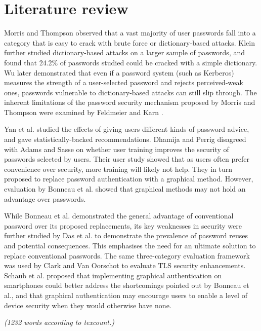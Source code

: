 \documentclass[11pt]{article}
\begin{document}
\section{Literature review}

Morris and Thompson \cite[p. 596]{morris1979password} observed that a vast majority of user passwords fall into a category that is easy to crack with brute force or dictionary-based attacks. Klein \cite{klein1990foiling} further studied dictionary-based attacks on a larger sample of passwords, and found that 24.2\% of passwords studied could be cracked with a simple dictionary. Wu \cite{wu1999real} later demonstrated that even if a password system (such as Kerberos) measures the strength of a user-selected password and rejects perceived-weak ones, passwords vulnerable to dictionary-based attacks can still slip through. The inherent limitations of the password security mechanism proposed by Morris and Thompson were examined by Feldmeier and Karn \cite{feldmeier1989unix}.

Yan et al. \cite{yan2004password} studied the effects of giving users different kinds of password advice, and gave statistically-backed recommendations. Dhamija and Perrig \cite[Sec. 5]{dhamija2000deja} disagreed with Adams and Sasse \cite{adams1999users} on whether user training improves the security of passwords selected by users. Their user study showed that as users often prefer convenience over security, more training will likely not help. They in turn proposed to replace password authentication with a graphical method. However, evaluation by Bonneau et al. \cite[Sec. IV, D]{bonneau2012quest} showed that graphical methods may not hold an advantage over passwords. 

While Bonneau et al. \cite{bonneau2012quest} demonstrated the general advantage of conventional password over its proposed replacements, its key weaknesses in security were further studied by Das et al. \cite{das2014tangled} to demonstrate the prevalence of password reuses and potential consequences. This emphasises the need for an ultimate solution to replace conventional passwords. The same three-category evaluation framework was used by Clark and Van Oorschot \cite{clark2013sok} to evaluate TLS security enhancements. Schaub et al. \cite{schaub2013exploring} proposed that implementing graphical authentication on smartphones could better address the shortcomings pointed out by Bonneau et al., and that graphical authentication may encourage users to enable a level of device security when they would otherwise have none.

\emph{(1232 words according to texcount.)}


\footnotesize{}
\end{document}

